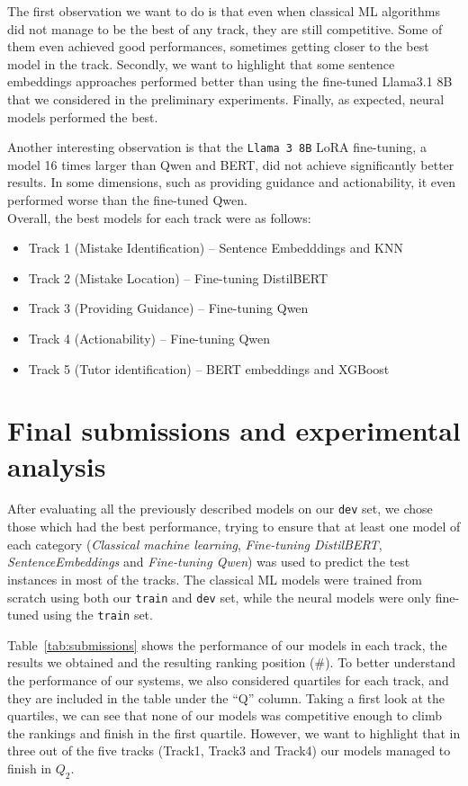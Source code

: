 \documentclass[11pt]{article}
\begin{document}
The first observation we want to do is that even when classical ML algorithms did not manage to be the best of any track, they are still competitive.
Some of them even achieved good performances, sometimes getting closer to the best model in the track.
Secondly, we want to highlight that some sentence embeddings approaches performed better than using the fine-tuned Llama3.1 8B that we considered in the preliminary experiments.
Finally, as expected, neural models performed the best.

Another interesting observation is that the \texttt{Llama 3 8B} LoRA fine-tuning, a model 16 times larger than Qwen and BERT, did not achieve significantly better results.
In some dimensions, such as providing guidance and actionability, it even performed worse than the fine-tuned Qwen.\\


Overall, the best models for each track were as follows: 
\begin{itemize}
    \setlength\itemsep{0em}
    \item Track 1 (Mistake Identification) -- Sentence Embedddings and KNN
    \item Track 2 (Mistake Location) -- Fine-tuning DistilBERT 
    \item Track 3 (Providing Guidance) -- Fine-tuning Qwen
    \item Track 4 (Actionability) -- Fine-tuning Qwen
    \item Track 5 (Tutor identification) -- BERT embeddings and XGBoost
\end{itemize}


\section{Final submissions and experimental analysis}
\label{sec:analysis}

After evaluating all the previously described models on our \texttt{dev} set, we chose those which had the best performance, trying to ensure that at least one model of each category (\textit{Classical machine learning}, \textit{Fine-tuning DistilBERT}, \textit{SentenceEmbeddings} and \textit{Fine-tuning Qwen}) was used to predict the test instances in most of the tracks.
The classical ML models were trained from scratch using both our \texttt{train} and \texttt{dev} set, while the neural models were only fine-tuned using the \texttt{train} set.

Table~\ref{tab:submissions} shows the performance of our models in each track, the results we obtained and the resulting ranking position (\#).
To better understand the performance of our systems, we also considered quartiles for each track, and they are included in the table under the ``Q'' column.
Taking a first look at the quartiles, we can see that none of our models was competitive enough to climb the rankings and finish in the first quartile.
However, we want to highlight that in three out of the five tracks (Track1, Track3 and Track4) our models managed to finish in $Q_2$.
\end{document}
